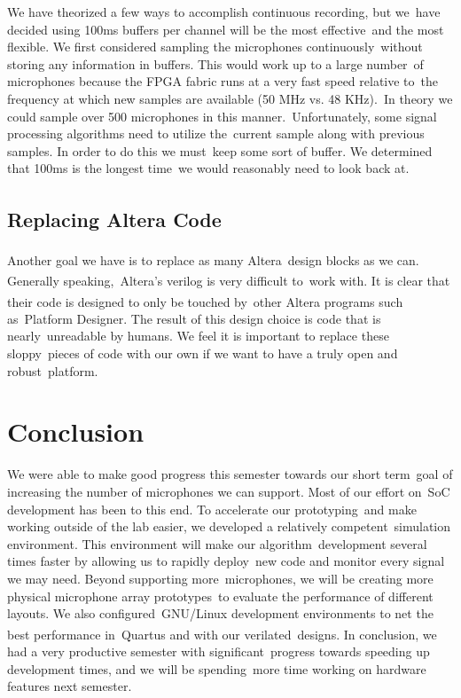 \documentclass{article}
\begin{document}
We have theorized a few ways to accomplish continuous recording, but we\
have decided using 100ms buffers per channel will be the most effective\
and the most flexible. We first considered sampling the microphones continuously\
without storing any information in buffers. This would work up to a large number\
of microphones because the FPGA fabric runs at a very fast speed relative to\
the frequency at which new samples are available (50 MHz vs. 48 KHz).\
In theory we could sample over 500 microphones in this manner.\
Unfortunately, some signal processing algorithms need to utilize the\
current sample along with previous samples. In order to do this we must\
keep some sort of buffer. We determined that 100ms is the longest time\
we would reasonably need to look back at.

\subsection{Replacing Altera\textsuperscript{\textregistered{}} Code}
Another goal we have is to replace as many Altera\textsuperscript{\textregistered{}}\
design blocks as we can. Generally speaking,\
Altera\textsuperscript{\textregistered{}}'s verilog is very difficult to\
work with. It is clear that their code is designed to only be touched by\
other Altera\textsuperscript{\textregistered{}} programs such as\
Platform Designer. The result of this design choice is code that is nearly\
unreadable by humans. We feel it is important to replace these sloppy\
pieces of code with our own if we want to have a truly open and robust\
platform.

\section{Conclusion}
We were able to make good progress this semester towards our short term\
goal of increasing the number of microphones we can support. Most of our effort on\
SoC development has been to this end. To accelerate our prototyping\
and make working outside of the lab easier, we developed a relatively competent\
simulation environment. This environment will make our algorithm\
development several times faster by allowing us to rapidly deploy\
new code and monitor every signal we may need. Beyond supporting more\
microphones, we will be creating more physical microphone array prototypes\
to evaluate the performance of different layouts. We also configured\
GNU/Linux development environments to net the best performance in\
Quartus\textsuperscript{\textregistered{}} and with our verilated\
designs. In conclusion, we had a very productive semester with significant\
progress towards speeding up development times, and we will be spending\
more time working on hardware features next semester.



\end{document}

